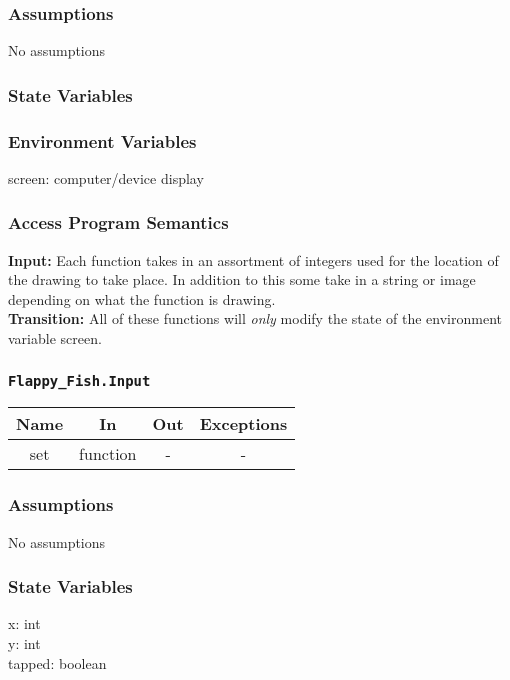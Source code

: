 \documentclass[11pt, oneside]{article}   	%
\begin{document}
\subsubsection*{Assumptions}
No assumptions

\subsubsection*{State Variables}
\subsubsection*{Environment Variables}
screen: computer/device display

\subsubsection*{Access Program Semantics} 
 \textbf{Input:} Each function takes in an assortment of integers used for the location of the drawing to take place. In addition to this some take in a string or image depending on what the function is drawing.\\
 \textbf{Transition:} All of these functions will \textit{only} modify the state of the environment variable screen.

\subsubsection*{\texttt{Flappy\_Fish.Input}}



\begin{center}
\begin{tabular}{ |c|c|c|c| } 
 \hline
 Name & In & Out & Exceptions \\ 
 \hline \hline
 set & function & - & - \\ 
 \hline
\end{tabular}
\end{center}

\subsubsection*{Assumptions}
No assumptions

\subsubsection*{State Variables}
x: int\\
y: int\\
tapped: boolean
\end{document}

